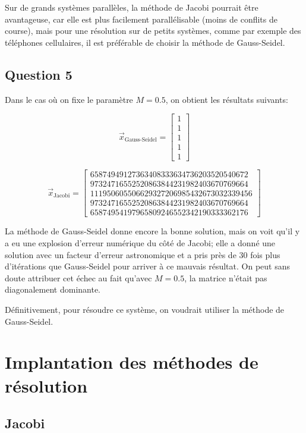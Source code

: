 \documentclass[10pt]{article}
\begin{document}
Sur de grands systèmes parallèles, la méthode de Jacobi pourrait être
avantageuse, car elle est plus facilement parallélisable (moins de
conflits de course), mais pour une résolution sur de petits systèmes,
comme par exemple des téléphones cellulaires, il est préférable de
choisir la méthode de Gauss-Seidel.

\subsection{Question 5}

Dans le cas où on fixe le paramètre $M=0.5$, on obtient les résultats
suivants:

\[
\vec{x}_{\text{Gauss-Seidel}} = \begin{bmatrix}
  1 \\ 1 \\ 1 \\ 1 \\ 1
\end{bmatrix} \tag{Itérations: 20}
\]

\[
\vec{x}_{\text{Jacobi}} = \begin{bmatrix}
  65874949127363408333634736203520540672 \\
  97324716552520863844231982403670769664 \\
  111950605506629327206985432673032339456 \\
  97324716552520863844231982403670769664 \\
  65874954197965809246552342190333362176
\end{bmatrix} \tag{Itérations: 578}
\]

La méthode de Gauss-Seidel donne encore la bonne solution, mais on
voit qu'il y a eu une explosion d'erreur numérique du côté de Jacobi;
elle a donné une solution avec un facteur d'erreur astronomique et a
pris près de 30 fois plus d'itérations que Gauss-Seidel pour arriver à
ce mauvais résultat.  On peut sans doute attribuer cet échec au fait
qu'avec $M=0.5$, la matrice n'était pas diagonalement dominante.

Définitivement, pour résoudre ce système, on voudrait utiliser la
méthode de Gauss-Seidel.


\section{Implantation des méthodes de résolution}

\subsection{Jacobi}
\end{document}
